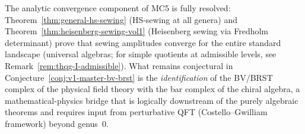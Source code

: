 \begin{remark}
\label{rem:mc5-vs-bv-brst}
The analytic convergence component of MC5 is fully resolved:
Theorem~\ref{thm:general-hs-sewing} (HS-sewing at all genera)
and Theorem~\ref{thm:heisenberg-sewing-vol1} (Heisenberg sewing via
Fredholm determinant) prove that sewing amplitudes converge for
the entire standard landscape (universal algebras; for simple
quotients at admissible levels, see
Remark~\ref{rem:thqg-I-admissible}). What remains conjectural in
Conjecture~\ref{conj:v1-master-bv-brst} is the \emph{identification}
of the BV/BRST complex of the physical field theory with the
bar complex of the chiral algebra, a mathematical-physics bridge
that is logically downstream of the purely algebraic theorems and
requires input from perturbative QFT (Costello--Gwilliam
framework) beyond genus~$0$.
\end{remark}

